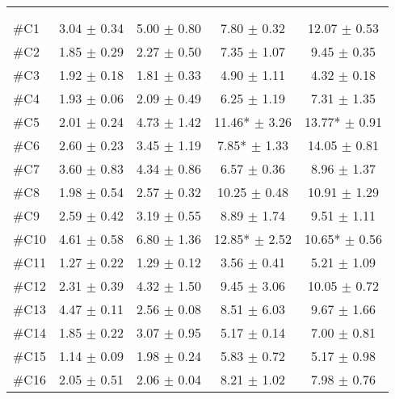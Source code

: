 \begin{longtable} {l|c|c|c|c}
 \rowcolor[HTML]{C0C0C0} 
  \color[HTML]{000000}{} & 
 \multicolumn{2}{c|}{ \color[HTML]{000000}{\textbf{Threshold}}} & \multicolumn{2}{c}{ \color[HTML]{000000}{\textbf{Tolerance}}}  	\\  \rule{0pt}{3ex} 
  \cellcolor[HTML]{C0C0C0}{} &
 \multicolumn{1}{c|}{ \cellcolor[HTML]{C0C0C0}{Pre [KgF]}} & \multicolumn{1}{c|}{ \cellcolor[HTML]{C0C0C0}{Post [KgF]}} & \multicolumn{1}{|c|}{ \cellcolor[HTML]{C0C0C0}{Pre [KgF]}} 
 & \multicolumn{1}{c|}{ \cellcolor[HTML]{C0C0C0}{Post [KgF]}} 	\\ \hline   
\#C1 & 3.04 $\pm$ 0.34	& 5.00 $\pm$ 0.80	& 7.80 $\pm$	 0.32 & 12.07 $\pm$ 0.53 \\ \hline
\#C2 & 1.85 $\pm$ 0.29 	& 2.27 $\pm$ 0.50	& 7.35 $\pm$ 1.07	& 9.45 $\pm$ 0.35	\\ \hline
\#C3 & 1.92 $\pm$ 0.18 & 1.81 $\pm$ 0.33	& 4.90 $\pm$ 1.11 	& 	4.32 $\pm$ 0.18	\\ \hline
\#C4 & 1.93 $\pm$ 0.06	& 2.09 $\pm$ 0.49	& 6.25 $\pm$ 1.19	&7.31 $\pm$ 	1.35 \\ \hline
\#C5 & 2.01 $\pm$ 0.24	& 4.73  $\pm$ 1.42 	& 11.46* $\pm$ 3.26 	& 13.77* $\pm$ 0.91	\\ \hline
\#C6 & 2.60 $\pm$ 0.23 	& 3.45 $\pm$ 1.19	& 7.85* $\pm$ 1.33	& 14.05 $\pm$ 0.81	\\ \hline	
\#C7 & 3.60 $\pm$ 0.83  & 4.34 $\pm$	0.86 	& 6.57 $\pm$ 0.36 & 8.96 $\pm$ 1.37 \\ \hline
\#C8 & 1.98 $\pm$ 0.54 & 2.57 $\pm$ 0.32 	& 10.25 $\pm$ 0.48	& 10.91 $\pm$  1.29 \\ \hline
\#C9 & 2.59 $\pm$ 0.42 & 3.19 $\pm$ 0.55 & 8.89 $\pm$ 1.74	& 9.51 $\pm$  1.11\\ \hline
\#C10 & 4.61 $\pm$ 0.58 & 6.80 $\pm$ 1.36 & 12.85* $\pm$ 2.52 	& 10.65*  $\pm$ 0.56 \\ \hline
\#C11 & 1.27 $\pm$ 0.22 & 1.29 	$\pm$ 0.12 	& 3.56 $\pm$ 0.41 & 5.21 $\pm$ 1.09 \\ \hline
\#C12 & 2.31 $\pm$ 0.39 & 4.32 $\pm$ 1.50	& 9.45 $\pm$ 3.06 & 10.05 $\pm$ 0.72 \\ \hline
\#C13 & 4.47 $\pm$ 0.11 & 2.56 $\pm$	0.08 & 8.51 $\pm$ 6.03 & 9.67 $\pm$  1.66\\ \hline
\#C14 & 1.85 $\pm$ 0.22 & 3.07 $\pm$ 0.95	 & 5.17 $\pm$ 0.14  & 7.00 $\pm$ 0.81 \\ \hline
\#C15 & 1.14 $\pm$ 0.09 & 1.98 $\pm$ 0.24  & 5.83 $\pm$ 0.72 & 5.17 $\pm$ 0.98 \\ \hline
\#C16 & 2.05 $\pm$ 0.51 & 2.06 $\pm$ 0.04  & 8.21 $\pm$ 1.02 & 7.98 $\pm$ 0.76 \\ \hline

\end{longtable}
